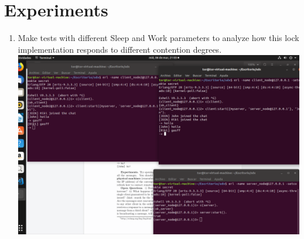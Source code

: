 \documentclass[a4paper, 10pt]{article}
\begin{document}
\section{Experiments}
\begin{enumerate}
  \item Make tests with different Sleep and Work parameters to  analyze  how  this  lock  implementation  responds  to  different  contention degrees.\\
  \includegraphics[width=\textwidth]{img1}\\\\



\end{enumerate}
\end{document}

